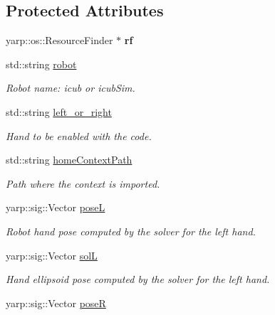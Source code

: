 \subsection*{Protected Attributes}
\begin{DoxyCompactItemize}
\item 
yarp\+::os\+::\+Resource\+Finder $\ast$ {\bfseries rf}\label{classGraspingModule_aed592146c8031a537a8d1f71a7e054c5}

\item 
std\+::string \hyperlink{classGraspingModule_a508cc33e7003b294f00316f362f82eaa}{robot}\label{classGraspingModule_a508cc33e7003b294f00316f362f82eaa}

\begin{DoxyCompactList}\small\item\em Robot name\+: icub or icub\+Sim. \end{DoxyCompactList}\item 
std\+::string \hyperlink{classGraspingModule_ab9603885e438ebe5a7f673c04bc37ed8}{left\+\_\+or\+\_\+right}\label{classGraspingModule_ab9603885e438ebe5a7f673c04bc37ed8}

\begin{DoxyCompactList}\small\item\em Hand to be enabled with the code. \end{DoxyCompactList}\item 
std\+::string \hyperlink{classGraspingModule_a0aa116f84336b88479b6f3ac6a97e76b}{home\+Context\+Path}\label{classGraspingModule_a0aa116f84336b88479b6f3ac6a97e76b}

\begin{DoxyCompactList}\small\item\em Path where the context is imported. \end{DoxyCompactList}\item 
yarp\+::sig\+::\+Vector \hyperlink{classGraspingModule_ae819bea3ec49cbec2703737a7a786007}{poseL}\label{classGraspingModule_ae819bea3ec49cbec2703737a7a786007}

\begin{DoxyCompactList}\small\item\em Robot hand pose computed by the solver for the left hand. \end{DoxyCompactList}\item 
yarp\+::sig\+::\+Vector \hyperlink{classGraspingModule_a0a13dee5ac1b2db61a87f82ecdc44ea6}{solL}\label{classGraspingModule_a0a13dee5ac1b2db61a87f82ecdc44ea6}

\begin{DoxyCompactList}\small\item\em Hand ellipsoid pose computed by the solver for the left hand. \end{DoxyCompactList}\item 
yarp\+::sig\+::\+Vector \hyperlink{classGraspingModule_a148c46809e3dba05972df158c81c48f8}{poseR}\label{classGraspingModule_a148c46809e3dba05972df158c81c48f8}


\end{DoxyCompactItemize}
